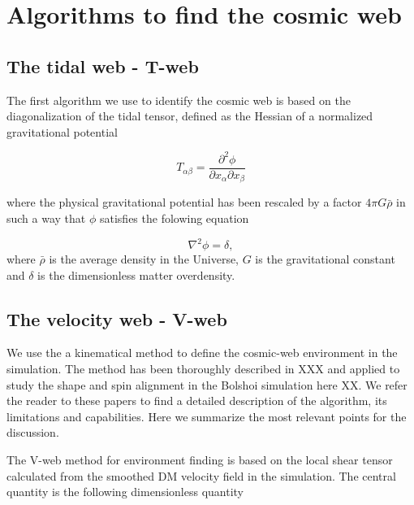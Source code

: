 \documentclass[usenatbib]{latex/mn2e}
\begin{document}

\section{Algorithms to find the cosmic web}

\subsection{The tidal web - T-web}
The first algorithm  we use to identify the cosmic web is based on the
diagonalization of the tidal tensor, defined as the Hessian of a
normalized gravitational potential  

\begin{equation}
T_{\alpha\beta} = \frac{\partial^2\phi}{\partial x_{\alpha}\partial x_{\beta}}
\end{equation}

where the physical gravitational potential has been rescaled by a factor $4\pi
G\bar{\rho}$ in such a way that $\phi$ satisfies the folowing equation

\begin{equation}
\nabla^2\phi = \delta,
\end{equation}
 where $\bar{\rho}$ is the average density in the
Universe, $G$ is the gravitational constant and $\delta$ is the
dimensionless matter overdensity.

\subsection{The velocity  web - V-web}
\label{sec:Vweb}


We use the a kinematical method to define the cosmic-web environment in 
the simulation. The method has been thoroughly described in XXX and 
applied to study the shape and spin alignment in the Bolshoi simulation 
here XX. We refer the reader to these papers to find a detailed description 
of the algorithm, its limitations and capabilities. Here we summarize the
most relevant points for the discussion. 


The V-web method for environment finding is based on the local shear 
tensor calculated from the smoothed DM velocity field in the simulation.
The central quantity is the following dimensionless quantity 
\end{document}
